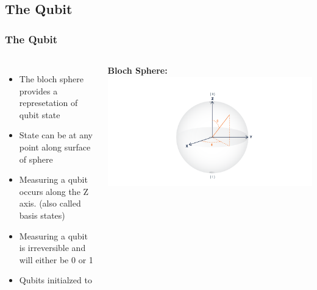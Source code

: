 \documentclass[aspectratio=169,11pt,hyperref={colorlinks=true}]{beamer}
\begin{document}
\subsection{The Qubit}
\begin{frame}
    \frametitle{The Qubit}
    \begin{columns}
            \begin{itemize}
                \item The bloch sphere provides a represetation of qubit state
                \item State can be at any point along surface of sphere
                \item Measuring a qubit occurs along the Z axis. (also called basis states)
                \item Measuring a qubit is irreversible and will either be 0
                      or 1
                \item Qubits initialzed to 
            \end{itemize}
            \centering
            \textbf{Bloch Sphere:}
            \includegraphics[width=\textwidth]{bloch_angles.png}
    \end{columns}
\end{frame}
\end{document}

